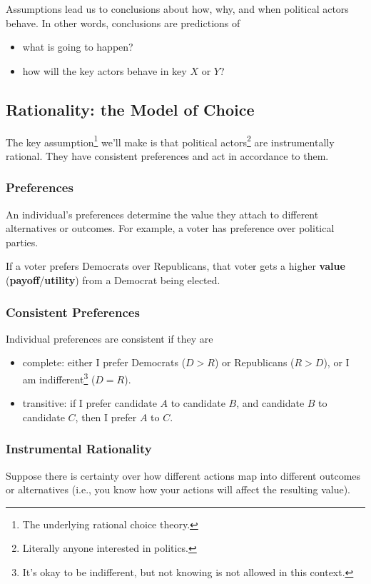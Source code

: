 \documentclass[letterpaper]{article}
\begin{document}
\bigskip 

Assumptions lead us to conclusions about how, why, and when political actors behave. In other words, conclusions are predictions of
\begin{itemize}
    \item what is going to happen? 
    \item how will the key actors behave in key $X$ or $Y$? 
\end{itemize}

\subsection{Rationality: the Model of Choice}
The key assumption\footnote{The underlying rational choice theory.} we'll make is that political actors\footnote{Literally anyone interested in politics.} are instrumentally rational. They have consistent preferences and act in accordance to them. 

\subsubsection{Preferences}
An individual's preferences determine the value they attach to different alternatives or outcomes. For example, a voter has preference over political parties.

\bigskip 

If a voter prefers Democrats over Republicans, that voter gets a higher \textbf{value} (\textbf{payoff}/\textbf{utility}) from a Democrat being elected. 

\subsubsection{Consistent Preferences}
Individual preferences are consistent if they are 
\begin{itemize}
    \item complete: either I prefer Democrats ($D > R$) or Republicans ($R > D$), or I am indifferent\footnote{It's okay to be indifferent, but not knowing is not allowed in this context.} ($D = R$).
    \item transitive: if I prefer candidate $A$ to candidate $B$, and candidate $B$ to candidate $C$, then I prefer $A$ to $C$. 
\end{itemize}


\subsubsection{Instrumental Rationality}
Suppose there is certainty over how different actions map into different outcomes or alternatives (i.e., you know how your actions will affect the resulting value). 
\end{document}
